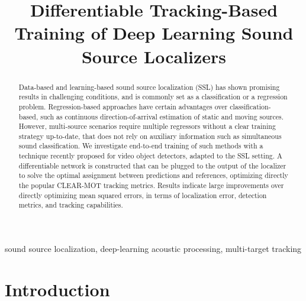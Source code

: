 \documentclass[conference]{IEEEtran}
\begin{document}
\title{Differentiable Tracking-Based Training of Deep Learning Sound Source Localizers
}

\author{
}

\maketitle

\begin{abstract}
Data-based and learning-based sound source localization (SSL) has shown promising results in challenging conditions, and is commonly set as a classification or a regression problem. Regression-based approaches have certain advantages over classification-based, such as continuous direction-of-arrival estimation of static and moving sources. However, multi-source scenarios require multiple regressors without a clear training strategy up-to-date, that does not rely on auxiliary information such as simultaneous sound classification. We investigate end-to-end training of such methods with a technique recently proposed for video object detectors, adapted to the SSL setting. A differentiable network is constructed that can be plugged to the output of the localizer to solve the optimal assignment between predictions and references, optimizing directly the popular CLEAR-MOT tracking metrics. Results indicate large improvements over directly optimizing mean squared errors, in terms of localization error, detection metrics, and tracking capabilities.
\end{abstract}

\begin{IEEEkeywords}
sound source localization, deep-learning acoustic processing, multi-target tracking \end{IEEEkeywords}

\section{Introduction}
\end{document}
